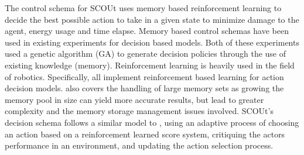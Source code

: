 The control schema for SCOUt uses memory based reinforcement learning to decide the best possible action to take in a given state to minimize damage to the agent, energy usage and time elapse.
Memory based control schemas have been used in existing experiments \cite{fu_genetic_2003, yi_new_2011} for decision based models.
Both of these experiments used a genetic algorithm (GA) to generate decision policies through the use of existing knowledge (memory).
Reinforcement learning is heavily used in the field of robotics.
Specifically, \cite{arulkumaran_brief_2017, bai_toward_2017, kiumarsi_optimal_2018} all implement reinforcement based learning for action decision models.
\cite{arulkumaran_brief_2017} also covers the handling of large memory sets as growing the memory pool in size can yield more accurate results, but lead to greater complexity and the memory storage management issues involved.
SCOUt's decision schema follows a similar model to \cite{kiumarsi_optimal_2018}, using an adaptive process of choosing an action based on a reinforcement learned score system, critiquing the actors performance in an environment, and updating the action selection process.
